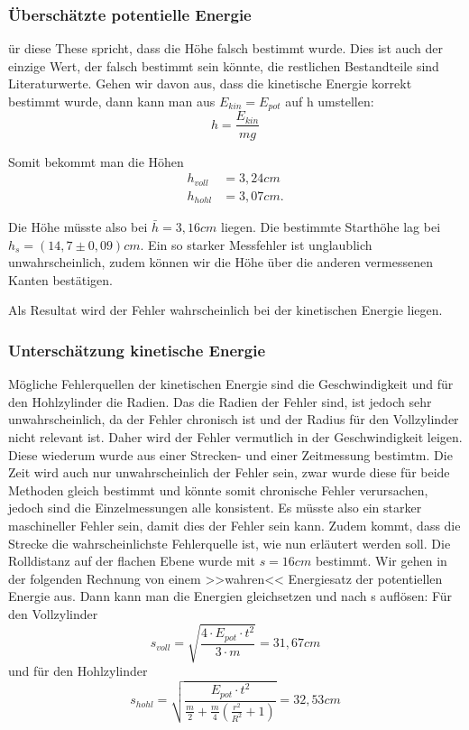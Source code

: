 \subsubsection*{Überschätzte potentielle Energie}
ür diese These spricht, dass die Höhe falsch bestimmt wurde. Dies ist auch der einzige Wert, der falsch bestimmt sein könnte, die restlichen Bestandteile sind Literaturwerte. Gehen wir davon aus, dass die kinetische Energie korrekt bestimmt wurde, dann kann man aus $E_{kin} = E_{pot}$ auf h umstellen:
\begin{equation}
    h = \frac{E_{kin}}{mg}
\end{equation}

Somit bekommt man die Höhen
\begin{align}
h_{voll} &= 3,24 cm \\
h_{hohl} &= 3,07 cm.
\end{align}

Die Höhe müsste also bei $\bar h = 3,16 cm$ liegen. Die bestimmte Starthöhe lag bei $h_s = (14,7 \pm 0,09)cm$. Ein so starker Messfehler ist unglaublich unwahrscheinlich, zudem können wir die Höhe über die anderen vermessenen Kanten bestätigen.

Als Resultat wird der Fehler wahrscheinlich bei der kinetischen Energie liegen.

\subsubsection*{Unterschätzung kinetische Energie}
Mögliche Fehlerquellen der kinetischen Energie sind die Geschwindigkeit und für den Hohlzylinder die Radien. Das die Radien der Fehler sind, ist jedoch sehr unwahrscheinlich, da der Fehler chronisch ist und der Radius für den Vollzylinder nicht relevant ist. Daher wird der Fehler vermutlich in der Geschwindigkeit leigen. 
Diese wiederum wurde aus einer Strecken- und einer Zeitmessung bestimtm. Die Zeit wird auch nur unwahrscheinlich der Fehler sein, zwar wurde diese für beide Methoden gleich bestimmt und könnte somit chronische Fehler verursachen, jedoch sind die Einzelmessungen alle konsistent. Es müsste also ein starker maschineller Fehler sein, damit dies der Fehler sein kann. Zudem kommt, dass die Strecke die wahrscheinlichste Fehlerquelle ist, wie nun erläutert werden soll.
Die Rolldistanz auf der flachen Ebene wurde mit $s = 16cm$ bestimmt.  Wir gehen in der folgenden Rechnung von einem >>wahren<< Energiesatz der potentiellen Energie aus. Dann kann man die Energien gleichsetzen und nach s auflösen:
Für den Vollzylinder
\begin{equation}
    s_{voll} = \sqrt{\frac{4 \cdot E_{pot} \cdot t^2}{3 \cdot m}} = 31,67 cm
\end{equation}
und für den Hohlzylinder
\begin{equation}
    s_{hohl} = \sqrt{\frac{E_{pot} \cdot t^2}{\frac{m}{2}+\frac{m}{4}(\frac{r^2}{R^2}+1)}} = 32,53 cm
\end{equation}

